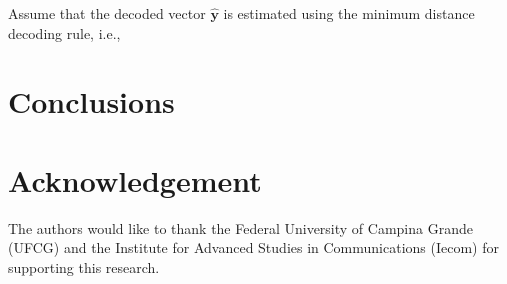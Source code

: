\documentclass[conference, 10pt]{IEEEtran}
\begin{document}
Assume that the decoded vector $\bm{\hat{y}}$ is estimated using the minimum distance decoding
rule, i.e.,

\section{Conclusions}

\section*{Acknowledgement}
The authors would like to thank the Federal University of Campina Grande (UFCG)
and the Institute for Advanced Studies in Communications (Iecom) for supporting
this research.



\end{document}
